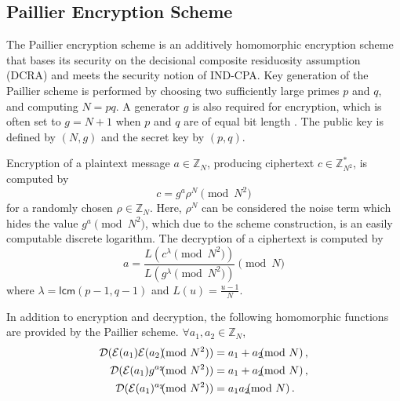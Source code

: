 \documentclass[10pt,letterpaper,oneside,twocolumn,journal]{IEEEtran}
\theoremstyle{definition}
\theoremstyle{definition}
\theoremstyle{remark}
\begin{document}
% 
% 

\subsection{Paillier Encryption Scheme} \label{subsec:paillier_scheme}
The Paillier encryption scheme \cite{paillierPublicKeyCryptosystemsBased1999} is an additively homomorphic encryption scheme that bases its security on the decisional composite residuosity assumption (DCRA) and meets the security notion of IND-CPA. Key generation of the Paillier scheme is performed by choosing two sufficiently large primes $p$ and $q$, and computing $N=pq$. A generator $g$ is also required for encryption, which is often set to $g=N+1$ when $p$ and $q$ are of equal bit length \cite{katzIntroductionModernCryptography2008}. The public key is defined by $(N, g)$ and the secret key by $(p, q)$.

Encryption of a plaintext message $a \in \mathbb{Z}_N$, producing ciphertext $c \in \mathbb{Z}^{*}_{N^2}$, is computed by
\begin{equation}
    c = g^a \rho^N \pmod{N^2}
\end{equation}
for a randomly chosen $\rho \in \mathbb{Z}_{N}$. Here, $\rho^N$ can be considered the noise term which hides the value $g^a \pmod{N^2}$, which due to the scheme construction, is an easily computable discrete logarithm. The decryption of a ciphertext is computed by
\begin{equation}
    a = \frac{L(c^\lambda\pmod{N^2})}{L(g^\lambda\pmod{N^2})} \pmod{N}
\end{equation}
where $\lambda = \mathsf{lcm}(p-1, q-1)$ and $L(u) = \frac{u-1}{N}$.

In addition to encryption and decryption, the following homomorphic functions are provided by the Paillier scheme. $\forall a_1,a_2 \in \mathbb{Z}_N$,
\begin{align}
    \mathcal{D}(\mathcal{E}(a_1)\mathcal{E}(a_2) \hspace{-7pt} \pmod{N^2}) &= a_1+a_2 \hspace{-7pt} \pmod{N}\,, \label{eqn:paillier_hom_add}\\
    \mathcal{D}(\mathcal{E}(a_1)g^{a_2} \hspace{-7pt} \pmod{N^2}) &= a_1+a_2\hspace{-7pt}\pmod{N}\,, \label{eqn:paillier_hom_plain_add}\\
    \mathcal{D}(\mathcal{E}(a_1)^{a_2} \hspace{-7pt} \pmod{N^2}) &= a_1a_2 \hspace{-7pt} \pmod{N}\,. \label{eqn:paillier_hom_mult}
\end{align}
\end{document}
